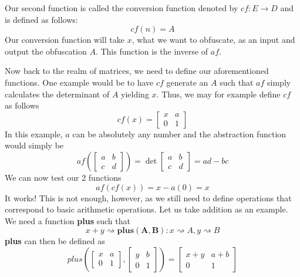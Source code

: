 Our second function is called the conversion function denoted by $ cf: E \to D
$ and is defined as follows:
\begin{equation*}
    cf (n) = A
\end{equation*}
Our conversion function will take $ x $, what we want to obfuscate, as an input
and output the obfuscation $ A $. This function is the inverse of $ af $.

Now back to the realm of matrices, we need to define our aforementioned
functions. One example would be to have $ cf $ generate an $ A $ such that $ af
$ simply calculates the determinant of $ A $ yielding $ x $. Thus, we may for
example define $ cf $ as follows
\begin{equation*}
    cf(x)
    =
    \begin{bmatrix}
        x & a \\
        0 & 1
    \end{bmatrix}
\end{equation*}
In this example, $ a $ can be absolutely any number and the abstraction
function would simply be
\begin{equation*}
    af \left(
    \begin{bmatrix}
        a & b \\
        c & d
    \end{bmatrix}
    \right)
    =
    \det
    \begin{bmatrix}
        a & b \\
        c & d
    \end{bmatrix}
    = ad - bc
\end{equation*}
We can now test our 2 functions
\begin{equation*}
    af(cf(x)) = x - a(0) = x
\end{equation*}
It works! This is not enough, however, as we still need to define operations
that correspond to basic arithmetic operations. Let us take addition as an
example. We need a function \textbf{plus} such that
\begin{equation*}
    x + y \rightsquigarrow \mathbf{plus(A, B)} : x \rightsquigarrow A, y
    \rightsquigarrow B
\end{equation*}
\textbf{plus} can then be defined as
\begin{equation*}
    plus\left(
    \begin{bmatrix}
        x & a \\
        0 & 1
    \end{bmatrix},
    \begin{bmatrix}
        y & b \\
        0 & 1
    \end{bmatrix}
    \right)
    =
    \begin{bmatrix}
        x + y & a + b \\
        0     & 1
    \end{bmatrix}
\end{equation*}
